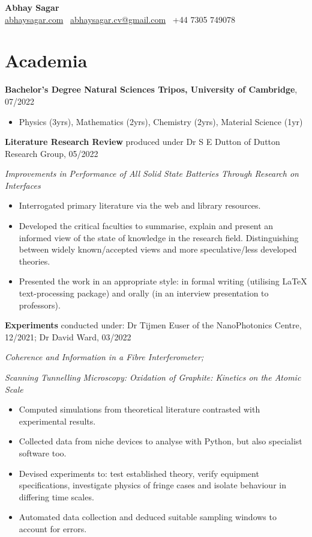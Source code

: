 \documentclass[a4paper]{article}
\begin{document}
\begin{center}
	{\huge\textbf{Abhay Sagar}}\\
	\href{https://www.abhaysagar.com}{abhaysagar.com} \textbar \ \href{mailto:abhaysagar.cv@gmail.com}{abhaysagar.cv@gmail.com} \textbar \ +44 7305 749078
\end{center}



\section{Academia}
\textbf{Bachelor's Degree Natural Sciences Tripos, University of Cambridge}, 07/2022

\begin{itemize}
	\item[]Physics (3yrs), Mathematics (2yrs), Chemistry (2yrs), Material Science (1yr)
\end{itemize}

\noindent\textbf{Literature Research Review} produced under Dr S E Dutton of Dutton Research Group, 05/2022

\textit{Improvements in Performance of All Solid State Batteries Through Research on Interfaces}

\begin{itemize}
	\item Interrogated primary literature via the web and library resources.
	\item Developed the critical faculties to summarise, explain and present an informed view of the state of knowledge in the research field. Distinguishing between widely known/accepted views and more speculative/less developed theories.
	\item Presented the work in an appropriate style: in formal writing (utilising LaTeX text-processing package) and orally (in an interview presentation to professors).
\end{itemize}


\noindent\textbf{Experiments} conducted under: Dr Tijmen Euser of the NanoPhotonics Centre, 12/2021; Dr David Ward, 03/2022

\textit{Coherence and Information in a Fibre Interferometer;}

\textit{Scanning Tunnelling Microscopy: Oxidation of Graphite: Kinetics on the Atomic Scale}

\begin{itemize}
	\item Computed simulations from theoretical literature contrasted with experimental results.
	\item Collected data from niche devices to analyse with Python, but also specialist software too.
	\item Devised experiments to: test established theory, verify equipment specifications, investigate physics of fringe cases and isolate behaviour in differing time scales.
	\item Automated data collection and deduced suitable sampling windows to account for errors.
\end{itemize}
\end{document}
